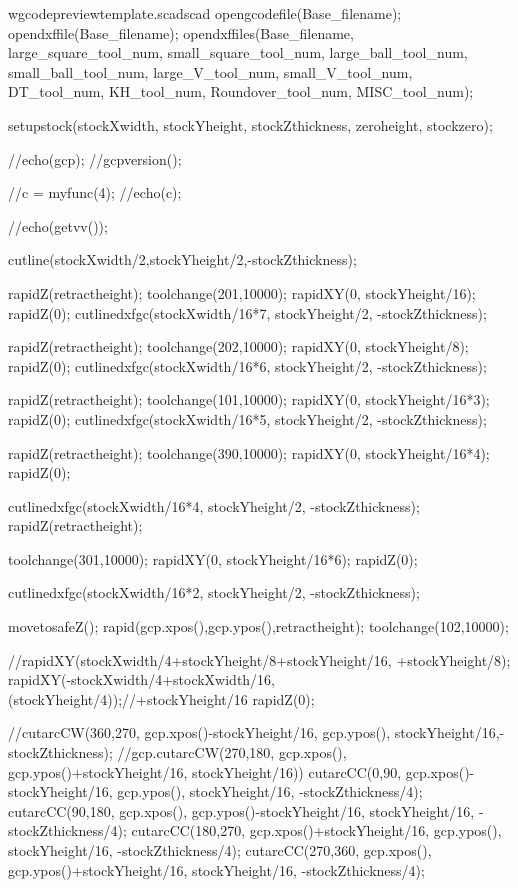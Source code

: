\documentclass{ltxdoc}
\begin{document}
\begin{writecode}{w}{gcodepreviewtemplate.scad}{scad}
opengcodefile(Base_filename);
opendxffile(Base_filename);
opendxffiles(Base_filename,
                 large_square_tool_num,
                 small_square_tool_num,
                 large_ball_tool_num,
                 small_ball_tool_num,
                 large_V_tool_num,
                 small_V_tool_num,
                 DT_tool_num,
                 KH_tool_num,
                 Roundover_tool_num,
                 MISC_tool_num);

setupstock(stockXwidth, stockYheight, stockZthickness, zeroheight, stockzero);

//echo(gcp);
//gcpversion();

//c = myfunc(4);
//echo(c);

//echo(getvv());

cutline(stockXwidth/2,stockYheight/2,-stockZthickness);

rapidZ(retractheight);
toolchange(201,10000);
rapidXY(0, stockYheight/16);
rapidZ(0);
cutlinedxfgc(stockXwidth/16*7, stockYheight/2, -stockZthickness);


rapidZ(retractheight);
toolchange(202,10000);
rapidXY(0, stockYheight/8);
rapidZ(0);
cutlinedxfgc(stockXwidth/16*6, stockYheight/2, -stockZthickness);

rapidZ(retractheight);
toolchange(101,10000);
rapidXY(0, stockYheight/16*3);
rapidZ(0);
cutlinedxfgc(stockXwidth/16*5, stockYheight/2, -stockZthickness);

rapidZ(retractheight);
toolchange(390,10000);
rapidXY(0, stockYheight/16*4);
rapidZ(0);

cutlinedxfgc(stockXwidth/16*4, stockYheight/2, -stockZthickness);
rapidZ(retractheight);

toolchange(301,10000);
rapidXY(0, stockYheight/16*6);
rapidZ(0);

cutlinedxfgc(stockXwidth/16*2, stockYheight/2, -stockZthickness);


movetosafeZ();
rapid(gcp.xpos(),gcp.ypos(),retractheight);
toolchange(102,10000);

//rapidXY(stockXwidth/4+stockYheight/8+stockYheight/16, +stockYheight/8);
rapidXY(-stockXwidth/4+stockXwidth/16, (stockYheight/4));//+stockYheight/16
rapidZ(0);

//cutarcCW(360,270, gcp.xpos()-stockYheight/16, gcp.ypos(), stockYheight/16,-stockZthickness);
//gcp.cutarcCW(270,180, gcp.xpos(), gcp.ypos()+stockYheight/16, stockYheight/16))
cutarcCC(0,90, gcp.xpos()-stockYheight/16, gcp.ypos(), stockYheight/16, -stockZthickness/4);
cutarcCC(90,180, gcp.xpos(), gcp.ypos()-stockYheight/16, stockYheight/16, -stockZthickness/4);
cutarcCC(180,270, gcp.xpos()+stockYheight/16, gcp.ypos(), stockYheight/16, -stockZthickness/4);
cutarcCC(270,360, gcp.xpos(), gcp.ypos()+stockYheight/16, stockYheight/16, -stockZthickness/4);


\end{writecode}
\end{document}
